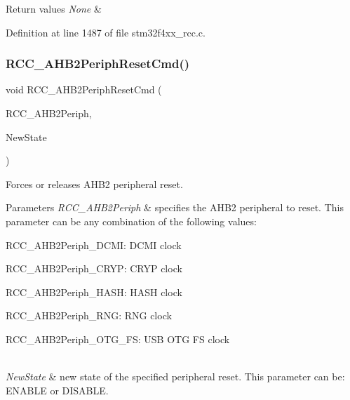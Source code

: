 \begin{DoxyRetVals}{Return values}
{\em None} & \\
\hline
\end{DoxyRetVals}


Definition at line 1487 of file stm32f4xx\+\_\+rcc.\+c.

\mbox{\label{group___r_c_c_gafb119d6d1955d1b8c361e8140845ac5a}} 
\subsubsection{\texorpdfstring{R\+C\+C\+\_\+\+A\+H\+B2\+Periph\+Reset\+Cmd()}{RCC\_AHB2PeriphResetCmd()}}
{\footnotesize\ttfamily void R\+C\+C\+\_\+\+A\+H\+B2\+Periph\+Reset\+Cmd (\begin{DoxyParamCaption}\item[{uint32\+\_\+t}]{R\+C\+C\+\_\+\+A\+H\+B2\+Periph,  }\item[{Functional\+State}]{New\+State }\end{DoxyParamCaption})}



Forces or releases A\+H\+B2 peripheral reset. 


\begin{DoxyParams}{Parameters}
{\em R\+C\+C\+\_\+\+A\+H\+B2\+Periph} & specifies the A\+H\+B2 peripheral to reset. This parameter can be any combination of the following values\+: \begin{DoxyItemize}
\item R\+C\+C\+\_\+\+A\+H\+B2\+Periph\+\_\+\+D\+C\+MI\+: D\+C\+MI clock \item R\+C\+C\+\_\+\+A\+H\+B2\+Periph\+\_\+\+C\+R\+YP\+: C\+R\+YP clock \item R\+C\+C\+\_\+\+A\+H\+B2\+Periph\+\_\+\+H\+A\+SH\+: H\+A\+SH clock \item R\+C\+C\+\_\+\+A\+H\+B2\+Periph\+\_\+\+R\+NG\+: R\+NG clock \item R\+C\+C\+\_\+\+A\+H\+B2\+Periph\+\_\+\+O\+T\+G\+\_\+\+FS\+: U\+SB O\+TG FS clock \end{DoxyItemize}
\\
\hline
{\em New\+State} & new state of the specified peripheral reset. This parameter can be\+: E\+N\+A\+B\+LE or D\+I\+S\+A\+B\+LE. \\
\hline
\end{DoxyParams}

